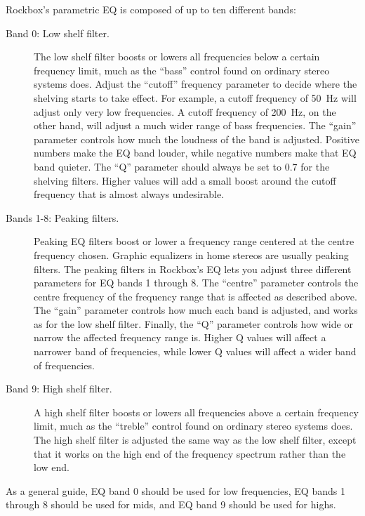   Rockbox's parametric EQ is composed of up to ten different bands:
  \begin{description}
  \item[Band 0: Low shelf filter.]
        The low shelf filter boosts or lowers all frequencies below a certain
        frequency limit, much as the ``bass'' control found on ordinary
        stereo systems does.
        Adjust the ``cutoff'' frequency parameter to decide where the shelving
        starts to take effect. For example, a cutoff frequency of 50~Hz will
        adjust only very low frequencies. A cutoff frequency of 200~Hz, on the
        other hand, will adjust a much wider range of bass frequencies.
        The ``gain'' parameter controls how much the loudness of the band is
        adjusted. Positive numbers make the EQ band louder, while negative
        numbers make that EQ band quieter.
        The ``Q'' parameter should always be set to 0.7 for the shelving
        filters. Higher values will add a small boost around the cutoff
        frequency that is almost always undesirable.
  \item[Bands 1-8: Peaking filters.]
        Peaking EQ filters boost or lower a frequency range centered at the
        centre frequency chosen.
        Graphic equalizers in home stereos are usually peaking
        filters. The peaking filters in Rockbox's EQ lets you adjust three
        different parameters for EQ bands 1 through 8. The ``centre'' parameter
        controls the centre frequency of the frequency range that is affected
        as described above.
        The ``gain'' parameter controls how much each band is adjusted, and
        works as for the low shelf filter.
        Finally, the ``Q'' parameter controls how wide or narrow the affected
        frequency range is. Higher Q values will affect a narrower band of
        frequencies, while lower Q values will affect a wider band of
        frequencies.
  \item[Band 9: High shelf filter.]
        A high shelf filter boosts or lowers all frequencies above a certain
        frequency limit, much as the ``treble'' control found on ordinary
        stereo systems does.
        The high shelf filter is adjusted the same way as the low shelf filter,
        except that it works on the high end of the frequency spectrum rather
        than the low end.
  \end{description}
  As a general guide, EQ band 0 should be used for low frequencies, EQ bands 1
  through 8 should be used for mids, and EQ band 9 should be used for highs.

